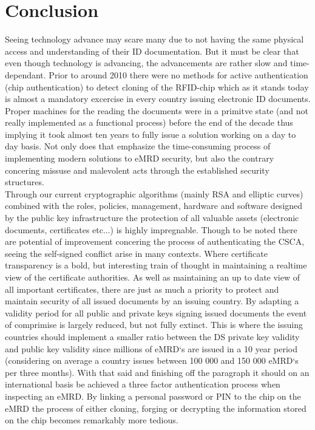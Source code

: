 \documentclass[12pt,
               a4paper,
               article,
               oneside,
               oldfontcommands,
               english]{memoir}
\begin{document}
\section*{Conclusion}
Seeing technology advance may scare many  due to not having the same physical access and understanding of their ID documentation. But it must be clear that even though technology is advancing, the advancements are rather slow and time-dependant. Prior to around 2010 there were no methods for active authentication (chip authentication) to detect cloning of the RFID-chip which as it stands today is almost a mandatory excercise in every country issuing electronic ID documents. Proper machines for the reading the documents were in a primitve state (and not really implemented as a functional process) before the end of the decade thus implying it took almost ten years to fully issue a solution working on a day to day basis. Not only does that emphasize the time-consuming process of implementing modern solutions to eMRD security, but also the contrary concering missuse and malevolent acts through the established security structures. \vspace{4mm}\\
Through our current cryptographic algorithms (mainly RSA and elliptic curves) combined with the roles, policies, management, hardware and software designed by the public key infrastructure the protection of all valuable assets (electronic documents, certificates etc...) is highly impregnable. Though to be noted there are potential of improvement concering the process of authenticating the CSCA, seeing the self-signed conflict arise in many contexts. Where certificate transparency is a bold, but interesting train of thought in maintaining a realtime view of the certificate authorities. As well as maintaining an up to date view of all important certificates, there are just as much a priority to protect and maintain security of all issued documents by an issuing country. By adapting a validity period for all public and private keys signing issued documents the event of comprimise is largely reduced, but not fully extinct. This is where the issuing countries should implement a smaller ratio between the DS private key validity and public key validity since  millions of eMRD`s are issued in a 10 year period (considering on average a country issues between 100 000 and 150 000 eMRD`s per three months). With that said and finishing off the paragraph it should on an international basis be achieved a three factor authentication process when inspecting an eMRD. By linking a personal password or PIN to the chip on the eMRD the process of either cloning, forging or decrypting the information stored on the chip becomes remarkably more tedious. 

\end{document}
